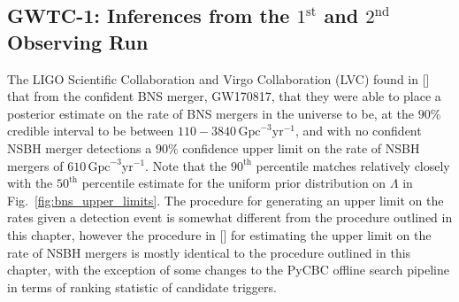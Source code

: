 \subsection{GWTC-1: Inferences from the $1^{\mathrm{st}}$ and $2^{\mathrm{nd}}$ Observing Run}
The LIGO Scientific Collaboration and Virgo Collaboration (LVC) found in [] that from the confident BNS merger, GW170817, that they were able to place a posterior estimate on the rate of BNS mergers in the universe to be, at the $90\%$ credible interval to be between $110 - 3840 \, \mathrm{Gpc}^{-3}\mathrm{yr}^{-1}$, and with no confident NSBH merger detections a $90\%$ confidence upper limit on the rate of NSBH mergers of $610 \, \mathrm{Gpc}^{-3}\mathrm{yr}^{-1}$. Note that the $90^\mathrm{th}$ percentile matches relatively closely with the $50^\mathrm{th}$ percentile estimate for the uniform prior distribution on $\Lambda$ in Fig.~\ref{fig:bns_upper_limits}. The procedure for generating an upper limit on the rates given a detection event is somewhat different from the procedure outlined in this chapter, however the procedure in [] for estimating the upper limit on the rate of NSBH mergers is mostly identical to the procedure outlined in this chapter, with the exception of some changes to the PyCBC offline search pipeline in terms of ranking statistic of candidate triggers.
